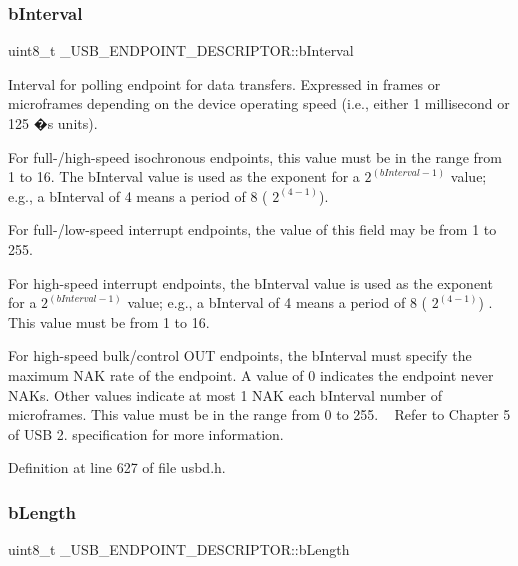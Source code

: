 \subsubsection{\texorpdfstring{b\+Interval}{bInterval}}
{\footnotesize\ttfamily uint8\+\_\+t \+\_\+\+U\+S\+B\+\_\+\+E\+N\+D\+P\+O\+I\+N\+T\+\_\+\+D\+E\+S\+C\+R\+I\+P\+T\+O\+R\+::b\+Interval}

Interval for polling endpoint for data transfers. Expressed in frames or microframes depending on the device operating speed (i.\+e., either 1 millisecond or 125 �s units). \begin{DoxyItemize}
\item For full-\//high-\/speed isochronous endpoints, this value must be in the range from 1 to 16. The b\+Interval value is used as the exponent for a $ 2^(bInterval-1) $ value; e.\+g., a b\+Interval of 4 means a period of 8 ( $ 2^(4-1) $). \item For full-\//low-\/speed interrupt endpoints, the value of this field may be from 1 to 255. \item For high-\/speed interrupt endpoints, the b\+Interval value is used as the exponent for a $ 2^(bInterval-1) $ value; e.\+g., a b\+Interval of 4 means a period of 8 ( $ 2^(4-1) $) . This value must be from 1 to 16. \item For high-\/speed bulk/control O\+UT endpoints, the b\+Interval must specify the maximum N\+AK rate of the endpoint. A value of 0 indicates the endpoint never N\+A\+Ks. Other values indicate at most 1 N\+AK each b\+Interval number of microframes. This value must be in the range from 0 to 255. ~\newline
Refer to Chapter 5 of U\+SB 2. specification for more information. \end{DoxyItemize}


Definition at line 627 of file usbd.\+h.

\mbox{\label{struct___u_s_b___e_n_d_p_o_i_n_t___d_e_s_c_r_i_p_t_o_r_aaea4723089a72e7d9b37077b9023c1a7}} 
\subsubsection{\texorpdfstring{b\+Length}{bLength}}
{\footnotesize\ttfamily uint8\+\_\+t \+\_\+\+U\+S\+B\+\_\+\+E\+N\+D\+P\+O\+I\+N\+T\+\_\+\+D\+E\+S\+C\+R\+I\+P\+T\+O\+R\+::b\+Length}

